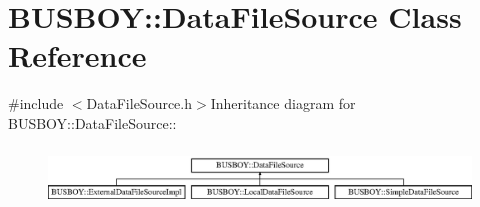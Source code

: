 \hypertarget{classBUSBOY_1_1DataFileSource}{
\section{BUSBOY::DataFileSource Class Reference}
\label{classBUSBOY_1_1DataFileSource}
}


{\ttfamily \#include $<$DataFileSource.h$>$}Inheritance diagram for BUSBOY::DataFileSource::\begin{figure}[H]
\begin{center}
\leavevmode
\includegraphics[height=1.60229cm]{classBUSBOY_1_1DataFileSource}
\end{center}
\end{figure}
